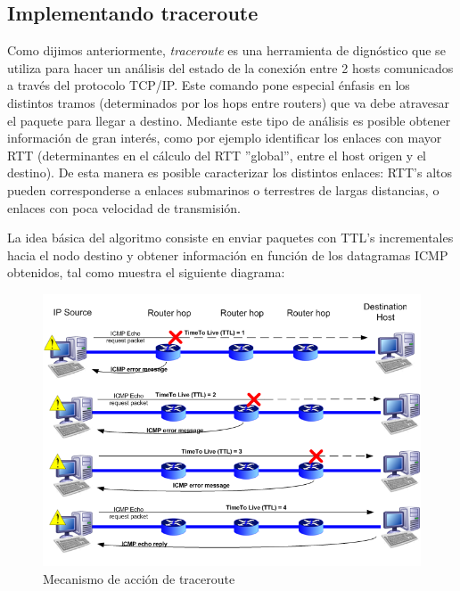 \subsection{Implementando traceroute}

Como dijimos anteriormente, \emph{traceroute} es una herramienta de dign\'ostico que se utiliza para hacer
un an\'alisis del estado de la conexi\'on entre 2 hosts comunicados a trav\'es del protocolo TCP/IP.
Este comando pone especial \'enfasis en los distintos tramos (determinados por los hops entre routers)
que va debe atravesar el paquete para llegar a destino.
Mediante este tipo de an\'alisis es posible obtener informaci\'on de gran inter\'es, como por
ejemplo identificar los enlaces con mayor RTT (determinantes en el c\'alculo del
RTT ''global'', entre el host origen y el destino). De esta manera es posible caracterizar los distintos
enlaces: RTT's altos pueden corresponderse a enlaces submarinos o terrestres de largas distancias, o
enlaces con poca velocidad de transmisión.

La idea b\'asica del algoritmo consiste en enviar paquetes con TTL's incrementales hacia el nodo destino
y obtener informaci\'on en funci\'on de los datagramas ICMP obtenidos, tal como muestra el siguiente
diagrama:

\begin{figure}[!h]
  \begin{center}
      \includegraphics[scale=0.4]{imagenes/traceroute.png}
      \caption{Mecanismo de acci\'on de traceroute}
      \label{fig:contra1}
  \end{center}
\end{figure}

